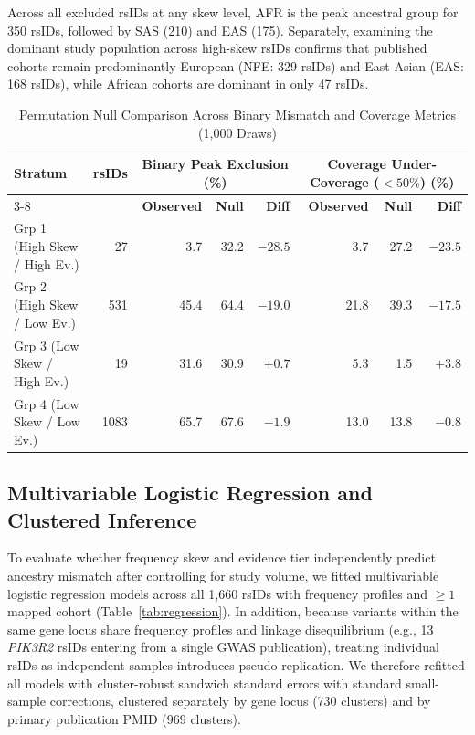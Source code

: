 \documentclass[conference]{IEEEtran}
\begin{document}
\begin{table}[!t]
Across all excluded rsIDs at any skew level, AFR is the peak ancestral group for 350 rsIDs, followed by SAS (210) and EAS (175).
Separately, examining the dominant study population across high-skew rsIDs confirms that published cohorts remain predominantly European (NFE: 329 rsIDs) and East Asian (EAS: 168 rsIDs), while African cohorts are dominant in only 47 rsIDs.

\begin{table}[!t]
\centering
\caption{Permutation Null Comparison Across Binary Mismatch and Coverage Metrics (1,000 Draws)}
\label{tab:perm-null}
\renewcommand{\arraystretch}{1.15}
\begin{tabular}{|l|r|r|r|r||r|r|r|}
\hline
\multirow{2}{*}{\textbf{Stratum}} & \multirow{2}{*}{\textbf{rsIDs}} & \multicolumn{3}{c||}{\textbf{Binary Peak Exclusion (\%)}} & \multicolumn{3}{c|}{\textbf{Coverage Under-Coverage ($<50\%$) (\%)}} \\
\cline{3-8}
 & & \textbf{Observed} & \textbf{Null} & \textbf{Diff} & \textbf{Observed} & \textbf{Null} & \textbf{Diff} \\
\hline
Grp 1 (High Skew / High Ev.) &   27 &  3.7 & 32.2 & $-28.5$ &  3.7 & 27.2 & $-23.5$ \\
\hline
Grp 2 (High Skew / Low Ev.)  &  531 & 45.4 & 64.4 & $-19.0$ & 21.8 & 39.3 & $-17.5$ \\
\hline
Grp 3 (Low Skew / High Ev.)  &   19 & 31.6 & 30.9 &  $+0.7$ &  5.3 &  1.5 &  $+3.8$ \\
\hline
Grp 4 (Low Skew / Low Ev.)   & 1083 & 65.7 & 67.6 &  $-1.9$ & 13.0 & 13.8 &  $-0.8$ \\
\hline
\end{tabular}
\end{table}

\subsection{Multivariable Logistic Regression and Clustered Inference}

To evaluate whether frequency skew and evidence tier independently predict ancestry mismatch after controlling for study volume, we fitted multivariable logistic regression models across all 1,660 rsIDs with frequency profiles and $\ge 1$ mapped cohort (Table~\ref{tab:regression}).
In addition, because variants within the same gene locus share frequency profiles and linkage disequilibrium (e.g., 13 \textit{PIK3R2} rsIDs entering from a single GWAS publication), treating individual rsIDs as independent samples introduces pseudo-replication.
We therefore refitted all models with cluster-robust sandwich standard errors with standard small-sample corrections, clustered separately by gene locus (730 clusters) and by primary publication PMID (969 clusters).


\end{table}
\end{document}
